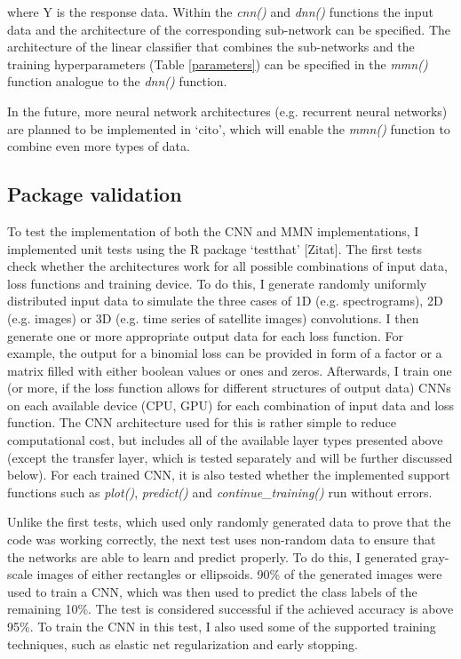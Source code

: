 \documentclass{article}
\newcommand{\pkg}[1]{`#1'}
\newcommand{\fn}[2][]{\textit{#2(}#1\textit{)}}
\begin{document}
where Y is the response data. Within the \fn{cnn} and \fn{dnn} functions the input data and the architecture of the corresponding sub-network can be specified. The architecture of the linear classifier that combines the sub-networks and the training hyperparameters (Table \ref{parameters}) can be specified in the \fn{mmn} function analogue to the \fn{dnn} function.

In the future, more neural network architectures (e.g. recurrent neural networks) are planned to be implemented in \pkg{cito}, which will enable the \fn{mmn} function to combine even more types of data. 

\subsection{Package validation}
To test the implementation of both the CNN and MMN implementations, I implemented unit tests using the R package \pkg{testthat} [Zitat]. The first tests check whether the architectures work for all possible combinations of input data, loss functions and training device. To do this, I generate randomly uniformly distributed input data to simulate the three cases of 1D (e.g. spectrograms), 2D (e.g. images) or 3D (e.g. time series of satellite images) convolutions. I then generate one or more appropriate output data for each loss function. For example, the output for a binomial loss can be provided in form of a factor or a matrix filled with either boolean values or ones and zeros. Afterwards, I train one (or more, if the loss function allows for different structures of output data) CNNs on each available device (CPU, GPU) for each combination of input data and loss function. The CNN architecture used for this is rather simple to reduce computational cost, but includes all of the available layer types presented above (except the transfer layer, which is tested separately and will be further discussed below). For each trained CNN, it is also tested whether the implemented support functions such as \fn{plot}, \fn{predict} and \fn{continue\_training} run without errors.

Unlike the first tests, which used only randomly generated data to prove that the code was working correctly, the next test uses non-random data to ensure that the networks are able to learn and predict properly. To do this, I generated gray-scale images of either rectangles or ellipsoids. 90\% of the generated images were used to train a CNN, which was then used to predict the class labels of the remaining 10\%. The test is considered successful if the achieved accuracy is above 95\%. To train the CNN in this test, I also used some of the supported training techniques, such as elastic net regularization and early stopping.
\end{document}
